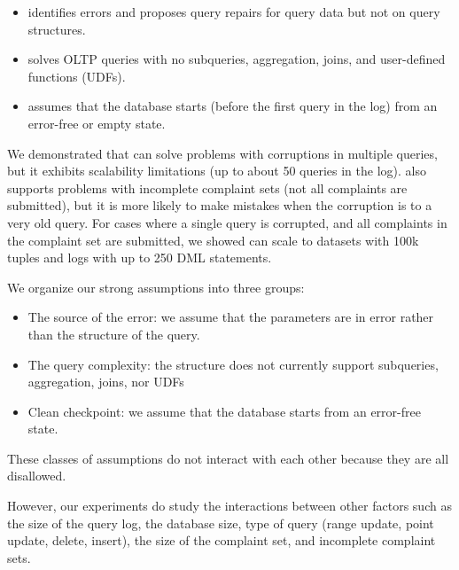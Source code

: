 \begin{itemize}
\item \sys identifies errors and proposes query repairs for query data but not on query structures.
\item \sys solves OLTP queries with no subqueries, aggregation, joins, and user-defined functions (UDFs).
\item \sys assumes that the database starts (before the first query in the log) from an error-free or empty state. 
\end{itemize}

We demonstrated that \sys can solve problems with corruptions in multiple queries, but it exhibits scalability limitations (up to about 50 queries in the log).  
\sys also supports problems with incomplete complaint sets (not all complaints are submitted), but it is more likely to make mistakes when the corruption is to a very old query.
For cases where a single query is corrupted, and all complaints in the complaint set are submitted, we showed \sys can scale to datasets with 100k tuples and logs with up to 250 DML statements.

\begin{quote}
\end{quote}


We organize our strong assumptions into three groups:
\begin{itemize}
\item The source of the error: we assume that the parameters are in error rather than the structure of the query.
\item The query complexity: the structure does not currently support subqueries, aggregation, joins, nor UDFs
\item Clean checkpoint: we assume that the database starts from an error-free state.
\end{itemize}
These classes of assumptions do not interact with each other because they are all disallowed.  

However, our experiments do study the interactions between other factors such as the size of the query log, the database size, type of query (range update, point update, delete, insert), the size of the complaint set, and incomplete complaint sets.



